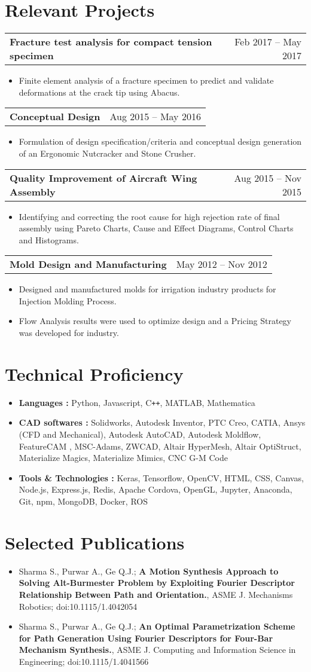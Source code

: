 \documentclass[letterpaper,10pt]{article}
\makeatletter
\newcommand{\resumeHeadingwithDate}[2]{
	\vspace{-1pt}
	\begin{tabular*}{0.97\textwidth}{l@{\extracolsep{\fill}}r}
		\textbf{#1} & #2 \vspace{-2pt}\\
	\end{tabular*}
	\vspace{+2pt}
}
\newcommand{\resumeSection}[1]{
\vspace{-12pt}
\section{\textbf{#1}}
}
\newcommand{\resumeItemListStart}{
\vspace{-7pt}
\begin{itemize}[leftmargin=14pt]
}
\newcommand{\resumeItemListEnd}{
\vspace{+7pt}
\end{itemize}
}
\newcommand{\resumeItem}[1]{
  \item\small{
      {#1 \vspace{-7pt}
      }
  }
}
\makeatother
\begin{document}
\resumeSection{Relevant Projects}
    \resumeHeadingwithDate{Fracture test analysis for compact tension specimen}{Feb 2017 -- May 2017}
    \resumeItemListStart
    \resumeItem{Finite element analysis of a fracture specimen to predict and validate deformations at the crack tip using Abacus.}
    \resumeItemListEnd
    
    \vspace{-4pt}
    \resumeHeadingwithDate{Conceptual Design}{Aug 2015 -- May 2016}
    \resumeItemListStart
    \resumeItem{Formulation of design specification/criteria and conceptual design generation of an Ergonomic Nutcracker and Stone Crusher.}
    \resumeItemListEnd
    
    \vspace{-4pt}
    \resumeHeadingwithDate{Quality Improvement of Aircraft Wing Assembly}{Aug 2015 -- Nov 2015}
    \resumeItemListStart
    \resumeItem{Identifying and correcting the root cause for high rejection rate of final assembly using Pareto Charts, Cause and Effect Diagrams, Control Charts and Histograms.}
    \resumeItemListEnd
    
    \vspace{-4pt}
    \resumeHeadingwithDate{Mold Design and Manufacturing}{May 2012 -- Nov 2012}
    \resumeItemListStart
    \resumeItem{Designed and manufactured molds for irrigation industry products for Injection Molding Process.}
    \resumeItem{Flow Analysis results were used to optimize design and a Pricing Strategy was developed for industry.}
    \resumeItemListEnd
    
    
    
\resumeSection{Technical Proficiency}
    \vspace{+7pt}
    \resumeItemListStart
    \resumeItem{\textbf{Languages :} Python, Javascript, C\texttt{++}, MATLAB, Mathematica}
    \resumeItem{\textbf{CAD softwares :} Solidworks, Autodesk Inventor, PTC Creo, CATIA, Ansys (CFD and Mechanical), Autodesk AutoCAD, Autodesk Moldflow, FeatureCAM , MSC-Adams, ZWCAD, Altair HyperMesh, Altair OptiStruct, Materialize Magics, Materialize Mimics, CNC G-M Code}
    \resumeItem{\textbf{Tools \& Technologies :} Keras, Tensorflow, OpenCV, HTML, CSS, Canvas, Node.js, Express.js, Redis, Apache Cordova, OpenGL, Jupyter, Anaconda, Git, npm, MongoDB, Docker, ROS}
    \resumeItemListEnd
    
    
    
\resumeSection{Selected Publications}
	\vspace{+7pt}
	\resumeItemListStart
	\resumeItem{Sharma S., Purwar A., Ge Q.J.; \textbf{A Motion Synthesis Approach to Solving Alt-Burmester Problem by Exploiting Fourier Descriptor Relationship Between Path and Orientation.}, ASME J. Mechanisms Robotics; doi:10.1115/1.4042054}
	\resumeItem{Sharma S., Purwar A., Ge Q.J.; \textbf{An Optimal Parametrization Scheme for Path Generation Using Fourier Descriptors for Four-Bar Mechanism Synthesis.}, ASME J. Computing and Information Science in Engineering; doi:10.1115/1.4041566}
	\resumeItemListEnd
\end{document}
